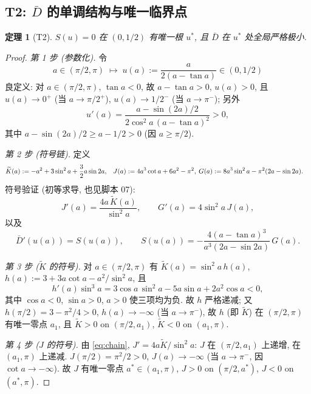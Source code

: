 \documentclass[UTF8]{ctexart}
\newtheorem{theorem}{定理}[section]
\begin{document}
\subsection{T2: \texorpdfstring{$\bar D$}{D} 的单调结构与唯一临界点}\label{sec:T2}
\begin{theorem}[T2]\label{thm:T2}
$S(u)=0$ 在 $(0,1/2)$ 有唯一根 $u^*$, 且 $\bar D$ 在 $u^*$ 处全局严格极小.
\end{theorem}
\begin{proof}
\emph{第 1 步 (参数化).} 令
\begin{equation}
	a\in(\pi/2,\pi)\;\longmapsto\;u(a):=\frac{a}{2(a-\tan a)}\in(0,1/2)
\end{equation}
良定义: 对 $a\in(\pi/2,\pi)$, $\tan a<0$, 故 $a-\tan a>0$, $u(a)>0$,
且 $u(a)\to0^+$ (当 $a\to\pi/2^+$), $u(a)\to1/2^-$ (当 $a\to\pi^-$);
另外
\begin{equation}
	u'(a)=\frac{a-\sin(2a)/2}{2\cos^2a\,(a-\tan a)^2}>0,
\end{equation}
其中 $a-\sin(2a)/2\ge a-1/2>0$ (因 $a\ge\pi/2$).

\emph{第 2 步 (符号链).} 定义
\begin{align}
	\widetilde K(a)&:=-a^2+3\sin^2a+\frac32a\sin2a, &
	J(a)&:=4a^3\cot a+6a^2-\pi^2, &\hspace{-0.6em}
	G(a)&:=8a^3\sin^2a-\pi^2(2a-\sin2a).
\end{align}
符号验证 (初等求导, 也见脚本 07):
\begin{equation}
	J'(a)=\frac{4a\,\widetilde K(a)}{\sin^2a},\qquad
	G'(a)=4\sin^2a\,J(a),
	\label{eq:chain}
\end{equation}
以及
\begin{equation}
	\bar D'(u(a))=S(u(a)),
	\qquad
	S(u(a))=-\frac{4(a-\tan a)^3}{a^3(2a-\sin2a)}\,G(a).
	\label{eq:SG}
\end{equation}

\emph{第 3 步 ($\widetilde K$ 的符号).} 对 $a\in(\pi/2,\pi)$ 有
$\widetilde K(a)=\sin^2a\,h(a)$, $h(a):=3+3a\cot a-a^2/\sin^2a$, 且
\begin{equation}
	h'(a)\sin^3a=3\cos a\,\sin^2a-5a\sin a+2a^2\cos a<0,
\end{equation}
其中 $\cos a<0$, $\sin a>0$, $a>0$ 使三项均为负. 故 $h$ 严格递减; 又
$h(\pi/2)=3-\pi^2/4>0$, $h(a)\to-\infty$ (当 $a\to\pi^-$), 故 $h$ (即 $\widetilde K$)
在 $(\pi/2,\pi)$ 有唯一零点 $a_1$, 且 $\widetilde K>0$ on $(\pi/2,a_1)$,
$\widetilde K<0$ on $(a_1,\pi)$.

\emph{第 4 步 ($J$ 的符号).} 由 \eqref{eq:chain}, $J'=4a\widetilde K/\sin^2a$:
$J$ 在 $(\pi/2,a_1)$ 上递增, 在 $(a_1,\pi)$ 上递减. $J(\pi/2)=\pi^2/2>0$,
$J(a)\to-\infty$ (当 $a\to\pi^-$, 因 $\cot a\to-\infty$). 故 $J$ 有唯一零点
$a^*\in(a_1,\pi)$, $J>0$ on $(\pi/2,a^*)$, $J<0$ on $(a^*,\pi)$.


\end{proof}
\end{document}

